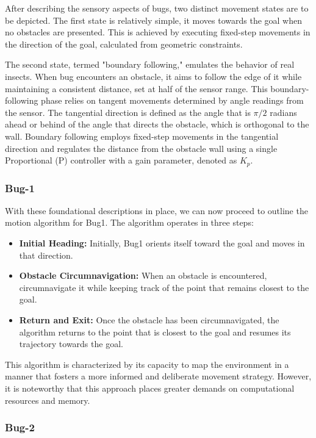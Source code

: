 \documentclass{IEEEtaes}
\begin{document}
After describing the sensory aspects of bugs, two distinct movement states are to be depicted. The first state is relatively simple, it moves towards the goal when no obstacles are presented. This is achieved by executing fixed-step movements in the direction of the goal, calculated from geometric constraints.

The second state, termed "boundary following," emulates the behavior of real insects. When bug encounters an obstacle, it aims to follow the edge of it while maintaining a consistent distance, set at half of the sensor range. This boundary-following phase relies on tangent movements determined by angle readings from the sensor. The tangential direction is defined as the angle that is $\pi/2$ radians ahead or behind of the angle that directs the obstacle, which is orthogonal to the wall. Boundary following employs fixed-step movements in the tangential direction and regulates the distance from the obstacle wall using a single Proportional (P) controller with a gain parameter, denoted as $K_p$.


\subsubsection{Bug-1}

With these foundational descriptions in place, we can now proceed to outline the motion algorithm for Bug1. The algorithm operates in three steps:
\begin{itemize}
\item
  \textbf{Initial Heading:} Initially, Bug1 orients itself toward the goal and moves in that direction.
\item
  \textbf{Obstacle Circumnavigation:} When an obstacle is encountered, circumnavigate it while keeping track of the point that remains closest to the goal.
\item
  \textbf{Return and Exit:} Once the obstacle has been circumnavigated, the algorithm returns to the point that is closest to the goal and resumes its trajectory towards the goal.
\end{itemize}
This algorithm is characterized by its capacity to map the environment in a manner that fosters a more informed and deliberate movement strategy. However, it is noteworthy that this approach places greater demands on computational resources and memory.


\subsubsection{Bug-2}
\end{document}
